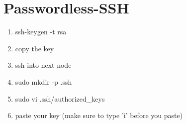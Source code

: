 \section{Passwordless-SSH}

\begin{enumerate}
\item ssh-keygen -t rsa
\item copy the key
\item ssh into next node
\item sudo mkdir -p .ssh
\item sudo vi .ssh/authorized_keys
\item paste your key (make sure to type 'i' before you paste)
\end{enumerate}
